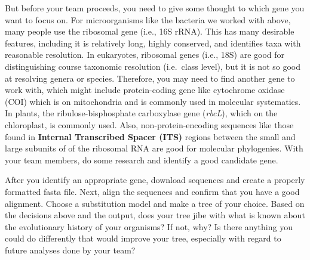 \documentclass[]{article}
\begin{document}
But before your team proceeds, you need to give some thought to which
gene you want to focus on. For microorganisms like the bacteria we
worked with above, many people use the ribosomal gene (i.e., 16S rRNA).
This has many desirable features, including it is relatively long,
highly conserved, and identifies taxa with reasonable resolution. In
eukaryotes, ribosomal genes (i.e., 18S) are good for distinguishing
course taxonomic resolution (i.e.~class level), but it is not so good at
resolving genera or species. Therefore, you may need to find another
gene to work with, which might include protein-coding gene like
cytochrome oxidase (COI) which is on mitochondria and is commonly used
in molecular systematics. In plants, the ribulose-bisphosphate
carboxylase gene (\emph{rbcL}), which on the chloroplast, is commonly
used. Also, non-protein-encoding sequences like those found in
\textbf{Internal Transcribed Spacer (ITS)} regions between the small and
large subunits of of the ribosomal RNA are good for molecular
phylogenies. With your team members, do some research and identify a
good candidate gene.

After you identify an appropriate gene, download sequences and create a
properly formatted fasta file. Next, align the sequences and confirm
that you have a good alignment. Choose a substitution model and make a
tree of your choice. Based on the decisions above and the output, does
your tree jibe with what is known about the evolutionary history of your
organisms? If not, why? Is there anything you could do differently that
would improve your tree, especially with regard to future analyses done
by your team?
\end{document}
